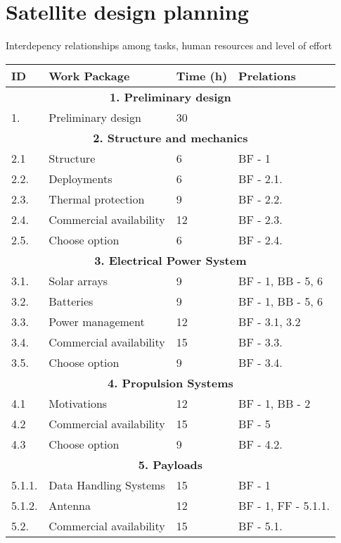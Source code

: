 \section{Satellite design planning}
Interdepency relationships among tasks, human resources and level of effort

\begin{longtable}{ | p{1.3cm} | p{7cm} | p{3cm} | p{3.5cm} |}
	\hline
	
	\textbf{ID }& \textbf{Work Package} & \textbf{Time (h)} & \textbf{Prelations} \\ \hline
	\multicolumn{4}{|c|}{\textbf{1. Preliminary design}} \\ \hline
	1. & Preliminary design & 30 &   \\ \hline
	\multicolumn{4}{|c|}{\textbf{2. Structure and mechanics}} \\ \hline
	2.1 & Structure & 6 & BF - 1 \\ \hline
	2.2. & Deployments & 6 & BF - 2.1.  \\ \hline
	2.3. & Thermal protection & 9 & BF - 2.2. \\ \hline
	2.4. & Commercial availability & 12 & BF - 2.3. \\ \hline
	2.5. & Choose option & 6 & BF - 2.4. \\ \hline
	\multicolumn{4}{|c|}{\textbf{3. Electrical Power System}} \\ \hline
	3.1. & Solar arrays & 9 & BF - 1, BB - 5, 6 \\ \hline
	3.2. & Batteries & 9 &BF - 1, BB - 5, 6 \\ \hline
	3.3. & Power management & 12 & BF - 3.1, 3.2\\ \hline
	3.4. & Commercial availability & 15 & BF - 3.3.\\ \hline
	3.5. & Choose option & 9 & BF - 3.4.\\ \hline
	\multicolumn{4}{|c|}{\textbf{4. Propulsion Systems}} \\ \hline
	4.1 & Motivations & 12 & BF - 1, BB - 2  \\ \hline
	4.2 & Commercial availability & 15 & BF - 5  \\ \hline
	4.3 & Choose option & 9 &   BF - 4.2. \\ \hline
	\multicolumn{4}{|c|}{\textbf{5. Payloads}} \\ \hline
	5.1.1. & Data Handling Systems & 15 & BF - 1 \\ \hline
	5.1.2. & Antenna & 12 & BF - 1, FF - 5.1.1. \\ \hline
	5.2. & Commercial availability & 15 & BF - 5.1.  \\ \hline

\end{longtable}
